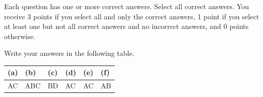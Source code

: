 
Each question has one or more correct answers. Select all correct answers. You receive 3 points if you select all and only the correct answers, 1 point if you select at least one but not all correct answers and no incorrect answers, and 0 points otherwise.

Write your answers in the following table.

\medskip
\begin{table}[htbp]
\centering
\begin{tabular}{|p{1.5cm}|p{1.5cm}|p{1.5cm}|p{1.5cm}|p{1.5cm}|p{1.5cm}|}
\hline
(a)&(b)&(c)&(d)&(e)&(f)\\\hline
AC & ABC & BD & AC & AC & AB \\\hline
\end{tabular}
\end{table}
\medskip

